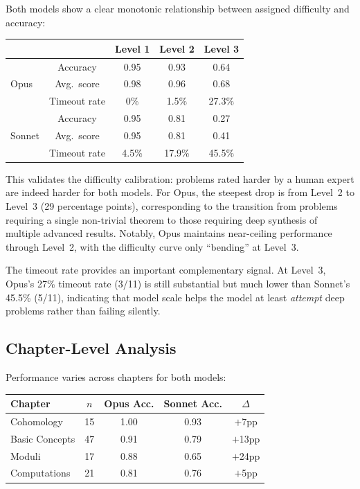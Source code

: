 Both models show a clear monotonic relationship between assigned difficulty and accuracy:

\begin{center}
\begin{tabular}{lcccc}
\toprule
& & Level 1 & Level 2 & Level 3 \\
\midrule
\multirow{3}{*}{Opus} & Accuracy & 0.95 & 0.93 & 0.64 \\
& Avg.\ score & 0.98 & 0.96 & 0.68 \\
& Timeout rate & 0\% & 1.5\% & 27.3\% \\
\midrule
\multirow{3}{*}{Sonnet} & Accuracy & 0.95 & 0.81 & 0.27 \\
& Avg.\ score & 0.95 & 0.81 & 0.41 \\
& Timeout rate & 4.5\% & 17.9\% & 45.5\% \\
\bottomrule
\end{tabular}
\end{center}

This validates the difficulty calibration: problems rated harder by a human expert are indeed harder for both models.
For Opus, the steepest drop is from Level~2 to Level~3 (29 percentage points), corresponding to the transition from problems requiring a single non-trivial theorem to those requiring deep synthesis of multiple advanced results.
Notably, Opus maintains near-ceiling performance through Level~2, with the difficulty curve only ``bending'' at Level~3.

The timeout rate provides an important complementary signal.
At Level~3, Opus's 27\% timeout rate (3/11) is still substantial but much lower than Sonnet's 45.5\% (5/11), indicating that model scale helps the model at least \emph{attempt} deep problems rather than failing silently.

\subsection{Chapter-Level Analysis}
\label{sec:chapter-analysis}

Performance varies across chapters for both models:

\begin{center}
\begin{tabular}{lcccc}
\toprule
\textbf{Chapter} & \textbf{$n$} & \textbf{Opus Acc.} & \textbf{Sonnet Acc.} & $\Delta$ \\
\midrule
Cohomology & 15 & 1.00 & 0.93 & $+$7pp \\
Basic Concepts & 47 & 0.91 & 0.79 & $+$13pp \\
Moduli & 17 & 0.88 & 0.65 & $+$24pp \\
Computations & 21 & 0.81 & 0.76 & $+$5pp \\
\bottomrule
\end{tabular}
\end{center}

